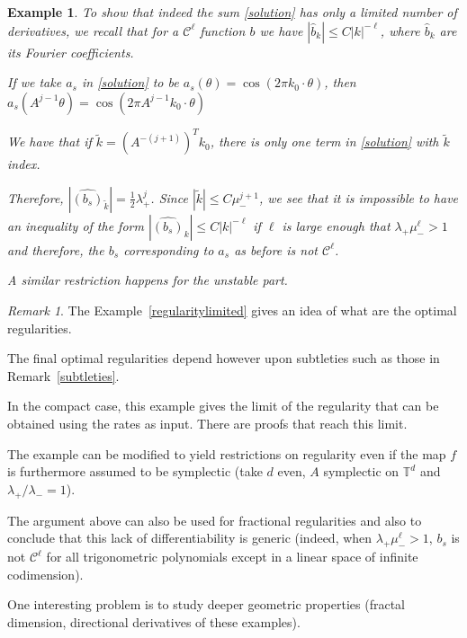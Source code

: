 \documentclass[11pt]{amsart}
\newtheorem{ex}[thm]{Example}
\theoremstyle{definition}
\theoremstyle{remark}
\newtheorem{rem}[thm]{Remark}
\numberwithin{equation}{section}
\newcommand{\C}{\mathcal{C}}
\def\torus{{\mathbb T}}
\begin{document}
\begin{ex}
To show that indeed
the sum \eqref{solution} has only a limited number of derivatives,
we recall
that  for a  $\C^\ell $ function $b$ we have
$ | \hat b_k| \le C |k|^{- \ell}$, where $\hat b_k $ are its Fourier coefficients.

If we take $a_s$ in \eqref{solution} to be
$a_s(\theta)= \cos( 2 \pi k_0\cdot \theta)$, then
$a_s(A^{j-1}\theta)= \cos( 2 \pi A^{j-1}k_0\cdot \theta)$

We have that if $\tilde k  = (  A^{-(j+1)})^T k_0  $,
there is only one term in \eqref{solution}
with $\tilde k $ index.

Therefore, $ |\widehat{ (b_s)}_{\tilde k }| = \frac{1}{2} \lambda_+^j  $.
Since $|\tilde k |  \le  C  \mu_-^{j+1}$,
we see that it is impossible to have an inequality
of the form $| \widehat{ (b_s)}_k | \le C |k|^{-\ell} $ if
$\ell  $ is large enough that $\lambda_+ \mu_-^\ell  > 1$
and therefore, the  $b_s$ corresponding to
$a_s$ as before
is not $\C^{\ell}$.

A similar restriction happens for the unstable part.
\end{ex}



\begin{rem}
  The Example~\ref{regularitylimited}
  gives an idea of what are the optimal regularities.

  The final optimal regularities depend however
  upon subtleties such as those in Remark~\ref{subtleties}.

In the compact case, this  example gives the limit of the regularity
that can be obtained using the rates as input.
There are proofs that reach this limit.

The example  can be modified to yield restrictions on regularity even if the map $f$ is
furthermore assumed to be symplectic (take $d$ even,   $A$  symplectic  on $\torus^d$
and $\lambda_+/\lambda_-  = 1$).


The argument above can also be used for fractional regularities
and also to conclude  that this lack of differentiability
is generic (indeed, when $\lambda_+ \mu_-^\ell > 1$,
 $b_s$ is not  $\C^\ell$ for all trigonometric polynomials
except in a linear space of infinite codimension).

One interesting problem is to study deeper geometric properties
(fractal dimension, directional derivatives of these examples).

\end{rem}

\medskip
\end{document}
